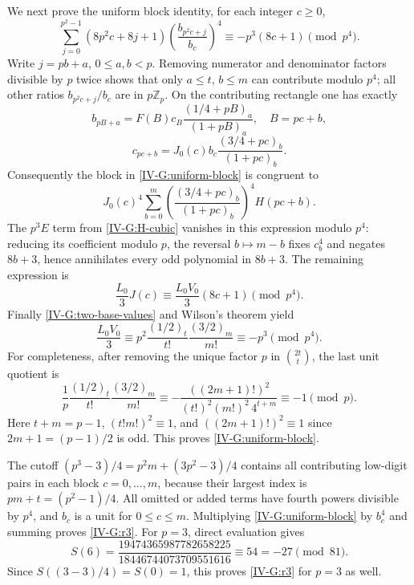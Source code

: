 \documentclass[11pt,letterpaper]{article}
\numberwithin{equation}{section}
\begin{document}
We next prove the uniform block identity, for each integer $c\ge0$,
\begin{equation}\label{IV-G:uniform-block}
\sum_{j=0}^{p^2-1}(8p^2c+8j+1)
 \left(\frac{b_{p^2c+j}}{b_c}\right)^4
 \equiv -p^3(8c+1)\pmod{p^4}.
\end{equation}
Write $j=pb+a$, $0\le a,b<p$. Removing numerator and denominator
factors divisible by $p$ twice shows that only $a\le t$, $b\le m$
can contribute modulo $p^4$; all other ratios $b_{p^2c+j}/b_c$ are
in $p\mathbb Z_p$. On the contributing rectangle one has exactly
\[
b_{pB+a}=F(B)c_B\frac{(1/4+pB)_a}{(1+pB)_a},\quad B=pc+b,
\]
\[
c_{pc+b}=J_0(c)b_c\frac{(3/4+pc)_b}{(1+pc)_b}.
\]
Consequently the block in \eqref{IV-G:uniform-block} is congruent to
\[
J_0(c)^4\sum_{b=0}^{m}
 \left(\frac{(3/4+pc)_b}{(1+pc)_b}\right)^4 H(pc+b).
\]
The $p^3E$ term from \eqref{IV-G:H-cubic} vanishes in this expression
modulo $p^4$: reducing its coefficient modulo $p$, the reversal
$b\mapsto m-b$ fixes $c_b^4$ and negates $8b+3$, hence annihilates
every odd polynomial in $8b+3$. The remaining expression is
\[
\frac{L_0}{3}J(c)
\equiv\frac{L_0V_0}{3}(8c+1)\pmod{p^4}.
\]
Finally \eqref{IV-G:two-base-values} and Wilson's theorem yield
\[
\frac{L_0V_0}{3}\equiv
p^2\frac{(1/2)_t}{t!}\frac{(3/2)_m}{m!}
\equiv-p^3\pmod{p^4}.
\]
For completeness, after removing the unique factor $p$ in
$\binom{2t}{t}$, the last unit quotient is
\[
\frac1p\frac{(1/2)_t}{t!}\frac{(3/2)_m}{m!}
\equiv-\frac{((2m+1)!)^2}{(t!)^2(m!)^2\,4^{t+m}}
\equiv-1\pmod p.
\]
Here $t+m=p-1$, $(t!m!)^2\equiv1$, and
$((2m+1)!)^2\equiv1$ since $2m+1=(p-1)/2$ is odd.
This proves \eqref{IV-G:uniform-block}.

The cutoff $(p^3-3)/4=p^2m+(3p^2-3)/4$ contains all contributing
low-digit pairs in each block $c=0,\ldots,m$, because their largest
index is $pm+t=(p^2-1)/4$. All omitted or added terms have fourth
powers divisible by $p^4$, and $b_c$ is a unit for $0\le c\le m$.
Multiplying \eqref{IV-G:uniform-block} by $b_c^4$ and summing proves
\eqref{IV-G:r3}. For $p=3$, direct evaluation gives
\[
S(6)=\frac{19474365987782658225}{18446744073709551616}
\equiv54=-27\pmod{81}.
\]
Since $S((3-3)/4)=S(0)=1$, this proves \eqref{IV-G:r3} for $p=3$
as well.
\end{document}
